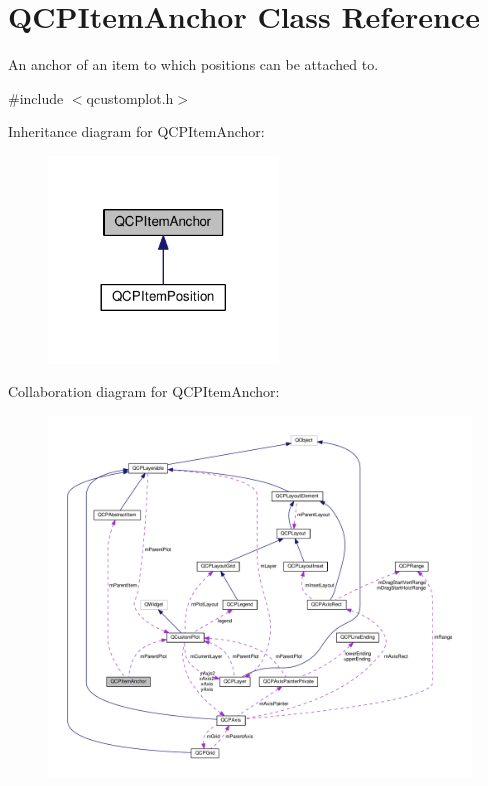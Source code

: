 \hypertarget{classQCPItemAnchor}{}\section{Q\+C\+P\+Item\+Anchor Class Reference}
\label{classQCPItemAnchor}


An anchor of an item to which positions can be attached to.  




{\ttfamily \#include $<$qcustomplot.\+h$>$}



Inheritance diagram for Q\+C\+P\+Item\+Anchor\+:\nopagebreak
\begin{figure}[H]
\begin{center}
\leavevmode
\includegraphics[width=173pt]{classQCPItemAnchor__inherit__graph}
\end{center}
\end{figure}


Collaboration diagram for Q\+C\+P\+Item\+Anchor\+:\nopagebreak
\begin{figure}[H]
\begin{center}
\leavevmode
\includegraphics[width=350pt]{classQCPItemAnchor__coll__graph}
\end{center}
\end{figure}
